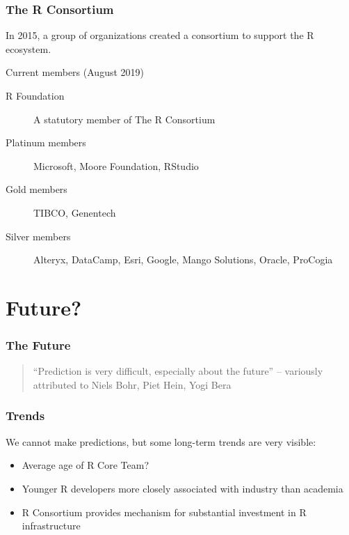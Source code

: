 \documentclass[svgnames]{beamer}
\begin{document}
\begin{frame}
  \frametitle{The R Consortium}

  In 2015, a group of organizations created a consortium to support
  the R ecosystem.

  Current members (August 2019)
  \begin{description}
  \item [R Foundation] A statutory member of The R Consortium
  \item[Platinum members] Microsoft, Moore Foundation, RStudio
  \item[Gold members] TIBCO, Genentech
  \item[Silver members] Alteryx, DataCamp, Esri, Google, Mango
    Solutions, Oracle, ProCogia
  \end{description}
  
\end{frame}

\section{Future?}

\begin{frame}
  \frametitle{The Future}

  \begin{quote}
    ``Prediction is very difficult, especially about the future''
    -- variously attributed to Niels Bohr, Piet Hein, Yogi Bera
  \end{quote}

\end{frame}

\begin{frame}
  \frametitle{Trends}

  We cannot make predictions, but some long-term trends are very visible:
  \begin{itemize}
  \item Average age of R Core Team?
  \item Younger R developers more closely associated with industry
    than academia
  \item R Consortium provides mechanism for substantial investment in
    R infrastructure
  \end{itemize}
\end{frame}
\end{document}
